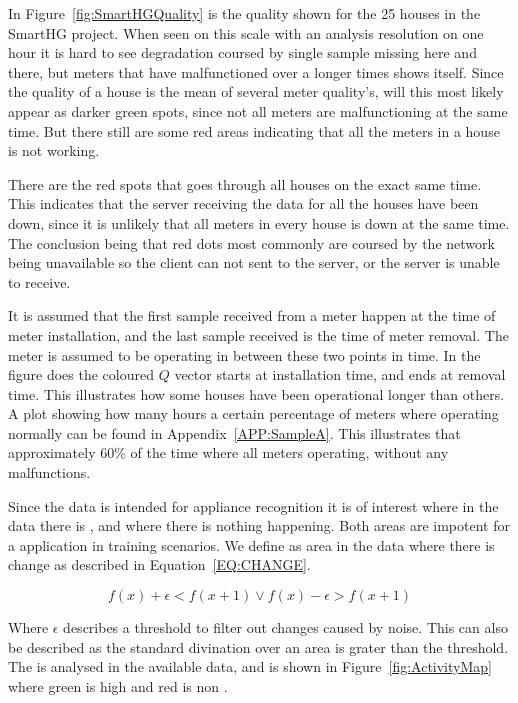 In Figure~\ref{fig:SmartHGQuality} is the  quality shown for the 25 houses in the SmartHG project. When seen on this scale with an analysis resolution on one hour it is hard to see degradation coursed by single sample missing here and there, but meters that have malfunctioned over a longer times shows itself. Since the quality of a house is the mean of several meter quality's, will this most likely appear as darker green spots, since not all meters are malfunctioning at the same time. But there still are some red areas indicating that all the meters in a house is not working. 

There are the red spots that goes through all houses on the exact same time. This indicates that the server receiving the data for all the houses have been down, since it is unlikely that all meters in every house is down at the same time. The conclusion being that red dots most commonly are coursed by the network being unavailable so the client can not sent to the server, or the server is unable to receive. 

It is assumed that the first sample received from a meter happen at the time of meter installation, and the last sample received is the time of meter removal. The meter is assumed to be operating in between these two points in time. In the figure does the coloured $Q$ vector starts at installation time, and ends at removal time. This illustrates how some houses have been operational longer than others. A plot showing how many hours a certain percentage of meters where operating normally can be found in Appendix~\ref{APP:SampleA}. This illustrates that approximately 60\% of the time where all meters operating, without any malfunctions.

Since the data is intended for appliance recognition it is of interest where in the data there is , and where there is nothing happening. Both areas are impotent for a  application in training scenarios. We define  as area in the data where there is change as described in Equation~\ref{EQ:CHANGE}.

\begin{equation}
f(x) + \epsilon < f(x+1) \vee f(x) - \epsilon > f(x+1)
\label{EQ:CHANGE}
\end{equation}

Where $\epsilon$ describes a threshold to filter out changes caused by noise. This can also be described as the standard divination over an area is grater than the threshold. The  is analysed in the available data, and is shown in Figure~\ref{fig:ActivityMap} where green is high  and red is non . 

